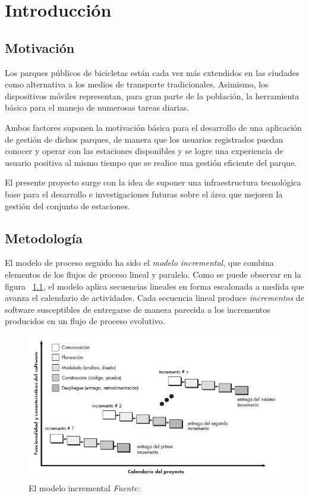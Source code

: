 \chapter{Introducción}

\section{Motivación}

Los parques públicos de bicicletas están cada vez más extendidos en las ciudades como alternativa a los medios de transporte tradicionales. Asimismo, los dispositivos móviles representan, para gran parte de la población, la herramienta básica para el manejo de numerosas tareas diarias.

Ambos factores suponen la motivación básica para el desarrollo de una aplicación de gestión de dichos parques, de manera que los usuarios registrados puedan conocer y operar con las estaciones disponibles y se logre una experiencia de usuario positiva al mismo tiempo que se realice una gestión eficiente del parque.

El presente proyecto surge con la idea de suponer una infraestructura tecnológica base para el desarrollo e investigaciones futuras sobre el área que mejoren la gestión del conjunto de estaciones.

\section{Metodología}

El modelo de proceso seguido ha sido el \emph{modelo incremental}, que combina elementos de los flujos de proceso lineal y paralelo. Como se puede observar en la figura ~\ref{fig:procesoIncremental}, el modelo aplica secuencias lineales en forma escalonada a medida que avanza el calendario de actividades. Cada secuencia lineal produce \emph{incrementos} de software susceptibles de entregarse de manera parecida a los incrementos producidos en un flujo de proceso evolutivo.

\begin{figure}
	\centering
	\includegraphics[width=\linewidth,height=\textheight,keepaspectratio]{Images/ModeloIncremental}
	\caption[El modelo incremental]{El modelo incremental \textit{Fuente:~\cite{Pre10}}}
	\label{fig:procesoIncremental}
\end{figure}

